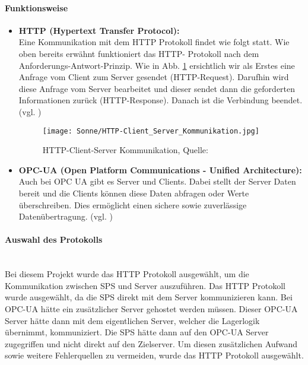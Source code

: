    \paragraph{Funktionsweise}

            \begin{itemize}
                \item \textbf{{HTTP (Hypertext Transfer Protocol):}} \mbox{} \\
                Eine Kommunikation mit dem HTTP Protokoll findet wie folgt statt. Wie oben bereits erwähnt funktioniert das HTTP- Protokoll nach dem Anforderungs-Antwort-Prinzip. Wie in Abb. \ref{HTTP-Client_Server_Kommunikation} ersichtlich wir als Erstes eine Anfrage vom Client zum Server gesendet (HTTP-Request). Darufhin wird diese Anfrage vom Server bearbeitet und dieser sendet dann die geforderten Informationen zurück (HTTP-Response). Danach ist die Verbindung beendet.
                (vgl. \cite{HTTP-Client_Server_Kommunikation})

                \begin{figure}[h]
                    \centering
                    \texttt{[image: Sonne/HTTP-Client\_Server\_Kommunikation.jpg]}
                    \caption{HTTP-Client-Server Kommunikation, Quelle:  
                    \cite{HTTP-Client_Server_Kommunikation}}
                    \label{HTTP-Client_Server_Kommunikation}
                \end{figure}
            
                \item \textbf{{OPC-UA (Open Platform Communications - Unified Architecture):}} \mbox{} \\
                Auch bei OPC UA gibt es Server und Clients. Dabei stellt der Server Daten bereit und die Clients können diese Daten abfragen oder Werte überschreiben. Dies ermöglicht einen sichere sowie zuverlässige Datenübertragung. 
                (vgl. \cite{OPC-UA})
            \end{itemize}

            
    \paragraph{Auswahl des Protokolls} \mbox{} \\
    Bei diesem Projekt wurde das HTTP Protokoll ausgewählt, um die Kommunikation zwischen SPS und Server auszuführen. Das HTTP Protokoll wurde ausgewählt, da die SPS direkt mit dem Server kommunizieren kann. Bei OPC-UA hätte ein zusätzlicher Server gehostet werden müssen. Dieser OPC-UA Server hätte dann mit dem eigentlichen Server, welcher die Lagerlogik übernimmt, kommuniziert. Die SPS hätte dann auf den OPC-UA Server zugegriffen und nicht direkt auf den Zielserver. Um diesen zusätzlichen Aufwand sowie weitere Fehlerquellen zu vermeiden, wurde das HTTP Protokoll ausgewählt.
            
